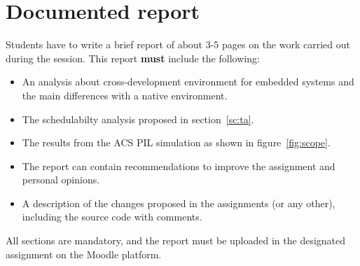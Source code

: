 \chapter{Documented report}

Students have to write a brief report of about 3-5 pages
on the work carried out during the session.
This report \textbf{must} include the following:

\begin{itemize}
	\item An analysis about cross-development environment for embedded systems and the main differences with a native environment.
	\item The schedulabilty analysis proposed in section~\ref{sc:ta}.
	\item The results from the ACS PIL simulation as shown in figure~\ref{fig:scope}.
	\item The report can contain recommendations to improve the assignment and personal opinions.
	\item A description of the changes proposed in the assignments (or any other), including the source code with comments.
\end{itemize}

All sections are mandatory, and the report must be uploaded in the designated assignment on the Moodle platform.